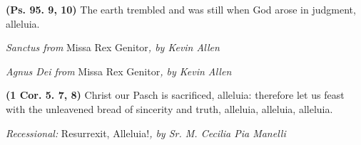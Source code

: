 \documentclass[11pt]{article} %
\begin{document}
\def\greinitialformat#1{%
{\fontsize{34}{34}\selectfont #1}%
}




\textbf{(Ps. 95. 9, 10)} The earth trembled and was still when God arose in judgment, alleluia.

\vskip10pt

\emph{Sanctus from} Missa Rex Genitor\emph{, by Kevin Allen}

\emph{Agnus Dei from} Missa Rex Genitor\emph{, by Kevin Allen}

\vskip20pt

\def\greinitialformat#1{%
{\fontsize{34}{34}\selectfont #1}%
}




\textbf{(1 Cor. 5. 7, 8)} Christ our Pasch is sacrificed, alleluia: therefore let us feast with the unleavened bread of sincerity and truth, alleluia, alleluia, alleluia.

\vskip10pt

\emph{Recessional:} Resurrexit, Alleluia!\emph{, by Sr. M. Cecilia Pia Manelli}
\end{document}
